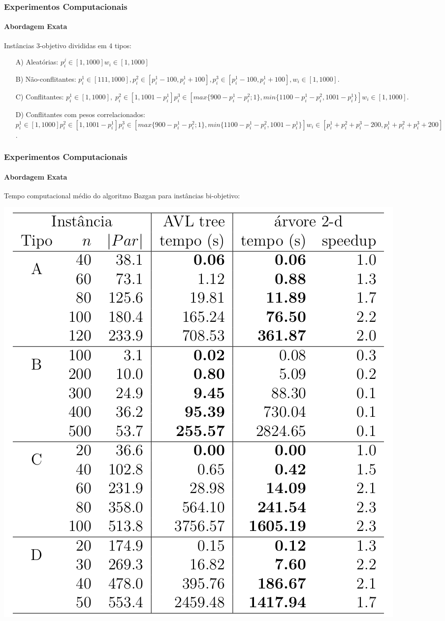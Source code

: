 \documentclass[10pt,xcolor=table,fleqn]{beamer}
\begin{document}
\begin{frame}
  \frametitle{Experimentos Computacionais}
  \framesubtitle{Abordagem Exata}
  Instâncias $3$-objetivo divididas em 4 tipos:
  \begin{enumerate}
    \item[A)] Aleatórias: $
      p^j_i \in [1, 1000]
      w_i \in [1,1000]$
    \vspace{3mm}
    \item[B)] Não-conflitantes: $
      p^1_i \in [111, 1000],
      p^2_i \in [p^1_i - 100, p^1_i + 100],
      p^3_i \in [p^1_i - 100, p^1_i + 100],
      w_i \in [1,1000]$.
    \vspace{3mm}
    \item[C)] Conflitantes: $
      p^1_i \in [1, 1000], \;
      p^2_i \in [1, 1001 - p^1_i]
      p^3_i \in [max\{900-p^1_i-p^2_i;1\}, min\{1100-p^1_i-p^2_i, 1001-p^1_i\}]
      w_i \in [1,1000]$.
    \vspace{3mm}
    \item[D)] Conflitantes com pesos correlacionados: $
      p^1_i \in [1, 1000]
      p^2_i \in [1, 1001 - p^1_i]
      p^3_i \in [max\{900-p^1_i-p^2_i;1\}, min\{1100-p^1_i-p^2_i, 1001-p^1_i\}]
      w_i \in [p^1_i+p^2_i+p^3_i-200, p^1_i+p^2_i+p^3_i+200]$.
  \end{enumerate}
\end{frame}

\begin{frame}
  \frametitle{Experimentos Computacionais}
  \framesubtitle{Abordagem Exata}
  Tempo computacional médio do algoritmo Bazgan para instâncias bi-objetivo:
  \scriptsize
  \begin{table}[h]
    \includegraphics[scale=0.3]{../tab/cpu2dim}
  \end{table}
\end{frame}
\end{document}
